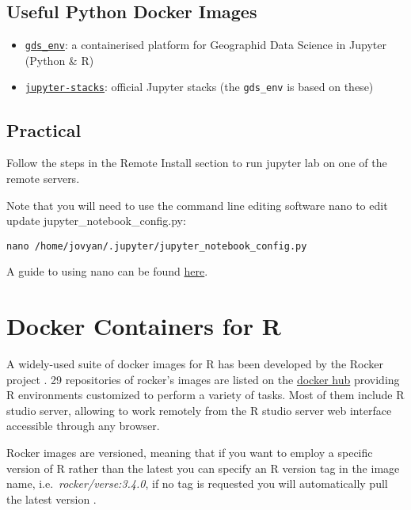 \documentclass[
]{book}
\providecommand{\tightlist}{%
  \setlength{\itemsep}{0pt}\setlength{\parskip}{0pt}}
\begin{document}
\hypertarget{useful-python-docker-images}{%
\section{Useful Python Docker Images}\label{useful-python-docker-images}}

\begin{itemize}
\tightlist
\item
  \href{https://github.com/darribas/gds_env}{\texttt{gds\_env}}: a containerised platform
  for Geographid Data Science in Jupyter (Python \& R)
\item
  \href{https://github.com/jupyter/docker-stacks}{\texttt{jupyter-stacks}}: official
  Jupyter stacks (the \texttt{gds\_env} is based on these)
\end{itemize}

\hypertarget{practical-2}{%
\section{Practical}\label{practical-2}}

Follow the steps in the Remote Install section to run jupyter lab on one of the remote servers.

Note that you will need to use the command line editing software nano to edit update jupyter\_notebook\_config.py:

\begin{verbatim}
nano /home/jovyan/.jupyter/jupyter_notebook_config.py
\end{verbatim}

A guide to using nano can be found \href{https://www.howtogeek.com/howto/42980/the-beginners-guide-to-nano-the-linux-command-line-text-editor/}{here}.

\hypertarget{docker-containers-for-r}{%
\chapter{Docker Containers for R}\label{docker-containers-for-r}}

A widely-used suite of docker images for R has been developed by the Rocker project \citep{RJ-2017-065}. 29 repositories of rocker's images are listed on the \href{https://hub.docker.com/u/rocker/}{docker hub} providing R environments customized to perform a variety of tasks. Most of them include R studio server, allowing to work remotely from the R studio server web interface accessible through any browser.

Rocker images are versioned, meaning that if you want to employ a specific version of R rather than the latest you can specify an R version tag in the image name, i.e.~\emph{rocker/verse:3.4.0}, if no tag is requested you will automatically pull the latest version \citep{RJ-2017-065}.
\end{document}
